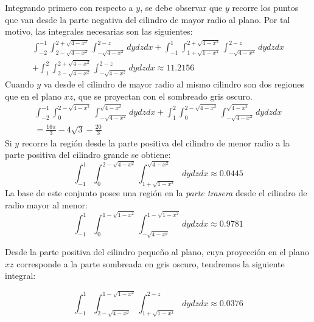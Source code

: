 Integrando primero con respecto a $y$, se debe observar que
$y$ recorre los puntos que van desde la parte negativa del cilindro de mayor radio al plano.
Por tal motivo, las integrales necesarias son las siguientes:
\begin{eqnarray}
\int_{-2}^{-1}\int_{2-\sqrt{4-x^2}}^{2+\sqrt{4-x^2}}\int_{-\sqrt{4-x^2}}^{2-z}dydzdx+
\int_{-1}^{1}\int_{1+\sqrt{1-x^2}}^{2+\sqrt{4-x^2}}\int_{-\sqrt{4-x^2}}^{2-z}dydzdx \nonumber \\
+ \int_{1}^2\int_{2-\sqrt{4-x^2}}^{2+\sqrt{4-x^2}}\int_{-\sqrt{4-x^2}}^{2-z}dydzdx \approx 11.2156 \label{31a}
\end{eqnarray}
Cuando $y$ va desde el cilindro de mayor radio al mismo cilindro son dos regiones que en el plano $xz$, que se proyectan con el sombreado gris oscuro.
\begin{eqnarray}
\int_{-2}^{-1}\int_{0}^{2-\sqrt{4-x^2}}\int_{-\sqrt{4-x^2}}^{\sqrt{4-x^2}}dydzdx
+\int_{1}^2\int_{0}^{2-\sqrt{4-x^2}}\int_{-\sqrt{4-x^2}}^{\sqrt{4-x^2}}dydzdx \nonumber \\
=\frac{16\pi}{3} -4\sqrt{3} -\frac{20}{3} \label{31b}
\end{eqnarray}
Si $y$ recorre la región desde la parte positiva del cilindro de menor radio a la parte positiva del cilindro grande se obtiene:
\begin{equation}\label{31c}
\int_{-1}^{1}\int_{0}^{2-\sqrt{4-x^2}}\int_{1+\sqrt{1-x^2}}^{\sqrt{4-x^2}}dydzdx\approx 0.0445
\end{equation}
La base de este conjunto posee una región en la \emph{parte trasera} desde el cilindro de radio mayor al menor:
\begin{equation}\label{31d}
\int_{-1}^{1}\int_{0}^{1-\sqrt{1-x^2}}\int_{-\sqrt{4-x^2}}^{1-\sqrt{1-x^2}}dydzdx\approx 0.9781
\end{equation}

Desde la parte positiva del cilindro pequeño al plano, cuya proyección en el plano $xz$ corresponde a la parte sombreada en gris oscuro, tendremos la siguiente integral:

\clearpage

\vspace*{-2\baselineskip}

\begingroup
\setlength{\abovedisplayskip}{0pt}
\setlength{\abovedisplayshortskip}{0pt}
\begin{equation}\label{31e}
\int_{-1}^{1}\int_{2-\sqrt{4-x^2}}^{1-\sqrt{1-x^2}}\int_{1+\sqrt{1-x^2}}^{2-z}dydzdx\approx 0.0376
\end{equation}
\endgroup


